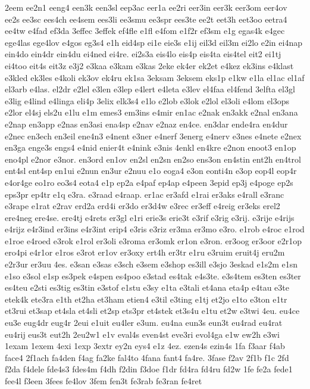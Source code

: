 {2eem
ee2n1
eeng4
een3k
een3sl
eep3ac
eer1a
ee2ri
eer3in
eer3k
eer3om
eer4ov
ee2s
ee3sc
ees4ch
ee4sem
ees3li
ee3smu
ee3spr
ees3te
ee2t
eet3h
eet3oo
eetra4
ee4tw
e4fad
ef3da
3effec
3effek
ef4fle
e1fl
e4fom
e1f2r
ef3sm
e1g
egas4k
e4gec
ege4las
ege4lov
e4gos
eg3s4
e1h
eid4sp
ei1e
eie3s
e1ij
eil3d
eil3m
ei2lo
e2in
ei4nap
ein4do
ein4dr
ein4du
ei4ned
ei4re.
ei2s3a
eis4lo
eis4p
eis4ta
eis4tel
eit2
ei1tj
ei4too
eit4s
eit3z
e3j2
e3kaa
e3kam
e3kas
2eke
ek4er
ek2et
e4kez
ek3ins
e4klast
e3kled
ek3les
e4koli
ek3ov
ek4ru
ek1sa
3eksam
3eksem
eks1p
e1kw
e1la
el1ac
el1af
el3arb
e4las.
el2dr
e2lel
e3len
e3lep
e4lert
e4leta
e3lev
el4faa
el4fend
3elfta
el3gl
e3lig
e4lind
e4linga
eli4p
3elix
elk3s4
e1lo
e2lob
e3lok
e2lol
el3oli
e4lom
el3ops
e2lor
el4sj
els2u
e1lu
e1m
emes3
em3ins
e4mir
en1ac
e2nak
en3akk
e2nal
en3ana
e2nap
en3app
e2nas
en3asi
ena4sp
e2nav
e2naz
en4ce.
en3dar
ende4ra
en4dur
e2nec
en3ech
en3eil
ene4n3
e4nent
e3ner
e4nerf
3energ
e4nerv
e3nes
e4nete
e2nex
en3ga
enge3s
engs4
e4nid
enier4t
e4nink
e3nis
4enkl
en4kre
e2non
enoot3
en1op
eno4pl
e2nor
e3nor.
en3ord
en1ov
en2sl
en2sn
en2so
ens3on
en4stin
ent2h
en4trol
ent4sl
ent4sp
en1ui
e2nun
en3ur
e2nuu
e1o
eoga4
e3on
eonti4n
e3op
eop4l
eop4r
e4or4ge
eo1ro
eo3s4
eota4
e1p
ep2a
e4paf
ep4ap
e4peen
3epid
ep3j
e4poge
ep2s
eps3pr
ep4tr
e1q
e3ra.
e3raad
e4raap.
er1ac
er3afd
e1rai
er3aks
e4rall
e3ranc
e3rape
e1rat
e2rav
erd2a
erd4i
er3do
er3d4w
e3rec
er3eff
e4reig
er3eks
erel2
ere4neg
ere4se.
ere4tj
e4rets
er3gl
e1ri
erie3s
erie3t
e3rif
e3rig
e3rij.
e3rije
e4rijs
e4rijz
e4r3ind
er3ins
e4r3int
erip4
e3ris
e3riz
er3ma
er3mo
e3ro.
e1rob
e4roc
e1rod
e1roe
e4roed
e3rok
e1rol
er3oli
e3roma
er3omk
er1on
e3ron.
er3oog
er3oor
e2r1op
ero4pi
e4r1or
e1ros
e3rot
er1ov
er3oxy
ert4h
er3tr
e1ru
e3ruim
eruit4j
eru2m
e2r3ur
er3uu
4es.
e3san
e3sas
e3sch
e3sem
e3shop
es3ill
e3sjo
3eskad
e1s2m
e1sn
e1so
e3sol
e1sp
es3pek
e4spen
es4poo
e3stad
es4tak
e4s3te.
e3s4tem
es3ten
es3ter
es4teu
e2sti
es3tig
es3tin
e3stof
e1stu
e3sy
e1ta
e3tali
et4ana
eta4p
e4tau
e3te
etek4k
ete3ra
e1th
et2ha
et3ham
etien4
e3til
e3ting
e1tj
et2jo
e1to
e3ton
e1tr
et3rui
et3sap
et4sla
et4sli
et2sp
ets3pr
et4stek
et3s4u
e1tu
et2w
e3twi
4eu.
eu4ce
eu3e
eug4dr
eug4r
2eui
e1uit
eu4ler
e3um.
eu4na
eun3s
eun3t
eu4rad
eu4rat
eu4rij
eus3t
eut2h
2eu2w1
e1v
eval4s
even4st
eve3ri
evol4ga
e1w
ew2h
e3wi
1exam
1exem
4exi
1exp
3extr
ey2n
eys4
e1z
4ez.
ezen4s
ezin4s
1fa
f3aar
f4ab
face4
2f1ach
fa4den
f4ag
fa2ke
fal4to
4fana
fant4
fa4re.
3fase
f2av
2f1b
f1c
2fd
f2da
f4dele
fde4s3
fdes4m
f4dh
f2din
f3doe
f1dr
fd4ra
fd4ru
fd2w
1fe
fe2a
fede1
fee4l
f3een
3fees
fe4lov
3fem
fen3t
fe3rab
fe3ran
fe4ret
}
